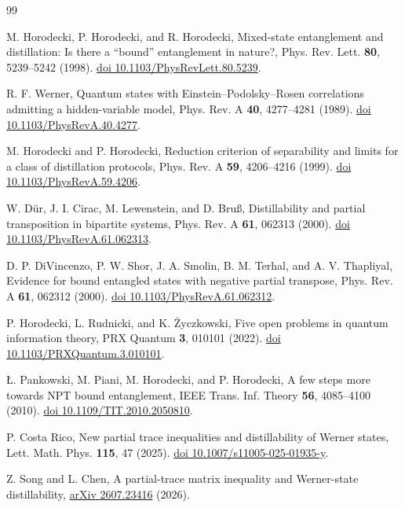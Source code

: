 \documentclass[aps,pra,reprint,superscriptaddress,amsmath,amssymb,floatfix,nofootinbib]{revtex4-2}
\begin{document}
\begin{thebibliography}{99}

M. Horodecki, P. Horodecki, and R. Horodecki,
Mixed-state entanglement and distillation: Is there a ``bound''
entanglement in nature?,
Phys. Rev. Lett. \textbf{80}, 5239--5242 (1998).
\href{https://doi.org/10.1103/PhysRevLett.80.5239}{doi 10.1103/PhysRevLett.80.5239}.

R. F. Werner,
Quantum states with Einstein--Podolsky--Rosen correlations admitting
a hidden-variable model,
Phys. Rev. A \textbf{40}, 4277--4281 (1989).
\href{https://doi.org/10.1103/PhysRevA.40.4277}{doi 10.1103/PhysRevA.40.4277}.

M. Horodecki and P. Horodecki,
Reduction criterion of separability and limits for a class of
distillation protocols,
Phys. Rev. A \textbf{59}, 4206--4216 (1999).
\href{https://doi.org/10.1103/PhysRevA.59.4206}{doi 10.1103/PhysRevA.59.4206}.

W. D\"ur, J. I. Cirac, M. Lewenstein, and D. Bru\ss,
Distillability and partial transposition in bipartite systems,
Phys. Rev. A \textbf{61}, 062313 (2000).
\href{https://doi.org/10.1103/PhysRevA.61.062313}{doi 10.1103/PhysRevA.61.062313}.

D. P. DiVincenzo, P. W. Shor, J. A. Smolin, B. M. Terhal, and A. V. Thapliyal,
Evidence for bound entangled states with negative partial transpose,
Phys. Rev. A \textbf{61}, 062312 (2000).
\href{https://doi.org/10.1103/PhysRevA.61.062312}{doi 10.1103/PhysRevA.61.062312}.

P. Horodecki, L. Rudnicki, and K. \.Zyczkowski,
Five open problems in quantum information theory,
PRX Quantum \textbf{3}, 010101 (2022).
\href{https://doi.org/10.1103/PRXQuantum.3.010101}{doi 10.1103/PRXQuantum.3.010101}.

\L{}. Pankowski, M. Piani, M. Horodecki, and P. Horodecki,
A few steps more towards NPT bound entanglement,
IEEE Trans. Inf. Theory \textbf{56}, 4085--4100 (2010).
\href{https://doi.org/10.1109/TIT.2010.2050810}{doi 10.1109/TIT.2010.2050810}.

P. Costa Rico,
New partial trace inequalities and distillability of Werner states,
Lett. Math. Phys. \textbf{115}, 47 (2025).
\href{https://doi.org/10.1007/s11005-025-01935-y}{doi 10.1007/s11005-025-01935-y}.

Z. Song and L. Chen,
A partial-trace matrix inequality and Werner-state distillability,
\href{https://arxiv.org/abs/2607.23416}{arXiv 2607.23416} (2026).


\end{thebibliography}
\end{document}
